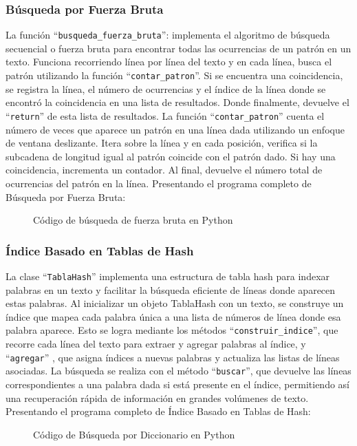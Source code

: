 \documentclass[12pt, twoside]{article}
\begin{document}
\subsubsection{Búsqueda por Fuerza Bruta}
La función ``\texttt{busqueda\_fuerza\_bruta}'': implementa el algoritmo de búsqueda secuencial o fuerza bruta para encontrar todas las ocurrencias de un patrón en un texto. Funciona recorriendo línea por línea del texto y en cada línea, busca el patrón utilizando la función ``\texttt{contar\_patron}''. Si se encuentra una coincidencia, se registra la línea, el número de ocurrencias y el índice de la línea donde se encontró la coincidencia en una lista de resultados. Donde finalmente, devuelve el ``\texttt{return}'' de esta lista de resultados.
\newline
\newline
La función ``\texttt{contar\_patron}'' cuenta el número de veces que aparece un patrón en una línea dada utilizando un enfoque de ventana deslizante. Itera sobre la línea y en cada posición, verifica si la subcadena de longitud igual al patrón coincide con el patrón dado. Si hay una coincidencia, incrementa un contador. Al final, devuelve el número total de ocurrencias del patrón en la línea.
\newline
\newline
Presentando el programa completo de Búsqueda por Fuerza Bruta:
\begin{figure}[H]
  \centering
  
  \caption{Código de búsqueda de fuerza bruta en Python}
  \label{fig:codigo-ejemplo}
\end{figure}

\subsubsection{Índice Basado en Tablas de Hash}
La clase ``\texttt{TablaHash}'' implementa una estructura de tabla hash para indexar palabras en un texto y facilitar la búsqueda eficiente de líneas donde aparecen estas palabras. Al inicializar un objeto TablaHash con un texto, se construye un índice que mapea cada palabra única a una lista de números de línea donde esa palabra aparece. Esto se logra mediante los métodos ``\texttt{construir\_indice}'', que recorre cada línea del texto para extraer y agregar palabras al índice, y ``\texttt{agregar}'' , que asigna índices a nuevas palabras y actualiza las listas de líneas asociadas. La búsqueda se realiza con el método ``\texttt{buscar}'', que devuelve las líneas correspondientes a una palabra dada si está presente en el índice, permitiendo así una recuperación rápida de información en grandes volúmenes de texto.
\newline
\newline
Presentando el programa completo de Índice Basado en Tablas de Hash:

\begin{figure}[H]
  \centering
  \caption{Código de Búsqueda por Diccionario en Python}
  \label{fig:codigo-tabla-hash}
\end{figure}
\end{document}
